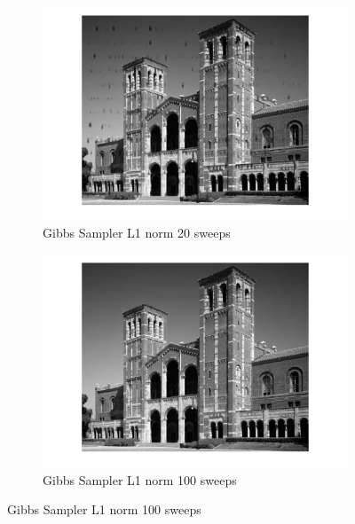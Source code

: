 \documentclass[11pt, oneside]{article}   	%
\begin{document}
\begin{figure}[H]
    \centering
    \begin{subfigure}[b]{0.49\textwidth}
        \includegraphics[width=\textwidth]{plot1_20}
        \caption{Gibbs Sampler L1 norm 20 sweeps}
        \label{fig:plot1_20}
    \end{subfigure}
    \begin{subfigure}[b]{0.49\textwidth}
        \includegraphics[width=\textwidth]{plot1_100}
        \caption{Gibbs Sampler L1 norm 100 sweeps}
        \label{fig:plot1_100}
    \end{subfigure}
    

\end{figure}
\end{document}
